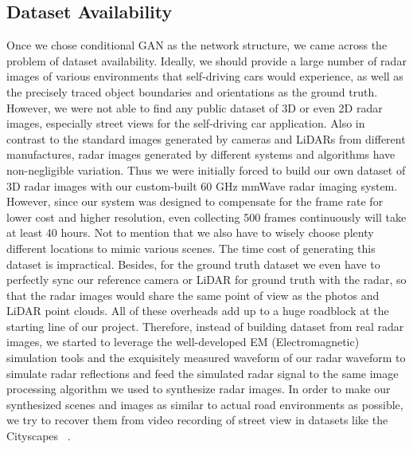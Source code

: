 \subsection{Dataset Availability}
Once we chose conditional GAN as the network structure, we came across the problem of dataset availability. Ideally, we should provide a large number of radar images of various environments that self-driving cars would experience, as well as the precisely traced object boundaries and orientations as the ground truth. However, we were not able to find any public dataset of 3D or even 2D radar images, especially street views for the self-driving car application. Also in contrast to the standard images generated by cameras and LiDARs from different manufactures, radar images generated by different systems and algorithms have non-negligible variation. Thus we were initially forced to build our own dataset of 3D radar images with our custom-built 60 GHz mmWave radar imaging system. However, since our system was designed to compensate for the frame rate for lower cost and higher resolution, even collecting 500 frames continuously will take at least 40 hours. Not to mention that we also have to wisely choose plenty different locations to mimic various scenes. The time cost of generating this dataset is impractical. Besides, for the ground truth dataset we even have to perfectly sync our reference camera or LiDAR for ground truth with the radar, so that the radar images would share the same point of view as the photos and LiDAR point clouds. All of these overheads add up to a huge roadblock at the starting line of our project. Therefore, instead of building dataset from real radar images, we started to leverage the well-developed EM (Electromagnetic) simulation tools and the exquisitely measured waveform of our radar waveform to simulate radar reflections and feed the simulated radar signal to the same image processing algorithm we used to synthesize radar images. In order to make our synthesized scenes and images as similar to actual road environments as possible, we try to recover them from video recording of street view in datasets like the Cityscapes ~\cite{cityscapes}.   

